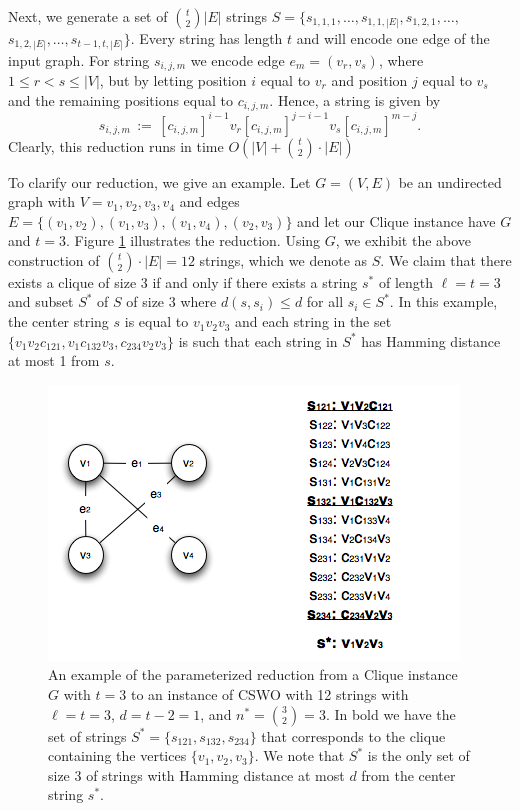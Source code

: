 Next, we generate a set of ${{t}\choose{2}} |E|$ strings $S = \{s_{1,1,1},  \ldots, s_{1,1,|E|}, s_{1,2,1}, \ldots, $ $s_{1,2,|E|}, \ldots, s_{t -1,t, |E|}\}$. Every string has length $t$ and will encode one edge of the input graph. For string $s_{i,j,m}$ we encode edge $e_m=  (v_r, v_s)$, where $1 \leq r < s \leq |V|$, but by letting position $i$ equal to $v_r$ and position $j$ equal to $v_s$ and the remaining positions equal to $c_{i,j,m}$. Hence, a string is given by $$s_{i,j,m}\, := \, [ c_{i,j,m} ]^{i - 1} v_r [ c_{i,j,m} ]^{j - i - 1} v_s [ c_{i,j,m} ]^{m - j}.$$  Clearly, this reduction runs in time $O(|V| + {t \choose 2} \cdot |E|)$

To clarify our reduction, we give an example. Let $G = (V, E)$ be an undirected graph with $V = {v_1, v_2, v_3, v_4}$ and edges $E = \{(v_1, v_2), (v_1, v_3), (v_1, v_4), (v_2, v_3)\}$ and let our {\sc Clique} instance have $G$ and $t = 3$.  Figure \ref{fig:example} illustrates the reduction.  Using $G$, we exhibit the above construction of ${t \choose 2} \cdot |E| = 12$ strings, which we denote as $S$.  We claim that there exists a clique of size 3 if and only if there exists a string $s^*$ of length $\ell = t = 3$ and subset $S^*$ of $S$ of size $3$ where $d(s, s_i) \leq d$ for all $s_i \in S^*$.  In this example, the center string $s$ is equal to $v_1 v_2 v_3$ and each string in the set $\{v_1 v_2 c_{121},  v_1 c_{132} v_3, c_{234} v_2 v_3\}$ is such that each string in $S^*$ has Hamming distance at most 1 from $s$.  

\begin{figure}[h!]
\begin{center} 
 \includegraphics[width=\linewidth]{images/example}
\caption[An example showing the parameterized reduction from {\sc Clique} to {\sc CSWO}.]{An example of the parameterized reduction from a {\sc Clique} instance $G$ with $t = 3$ to an instance of {\sc CSWO} with 12 strings with $\ell = t = 3$, $d = t - 2 = 1$, and $n^* = {3 \choose 2} = 3$.  In bold we have the set of strings $S^* = \{s_{121}, s_{132}, s_{234}\}$ that corresponds to the clique containing the vertices $\{v_1, v_2, v_3\}$.  We note that $S^*$ is the only set of size 3 of strings with Hamming distance at most $d$ from the center string $s^*$. }
\label{fig:example}
\end{center}
\end{figure}

